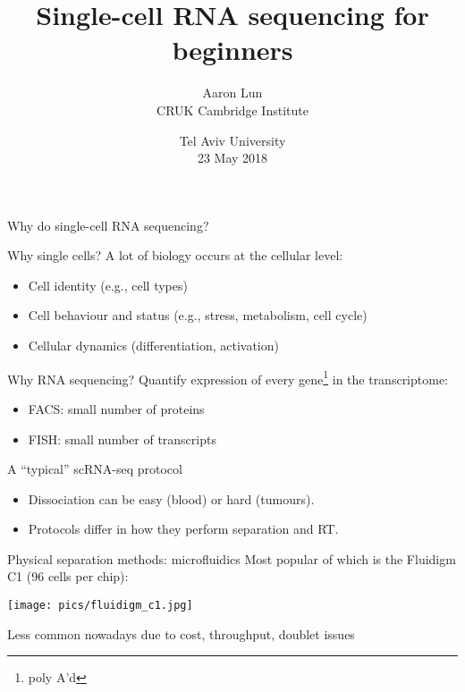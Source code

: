 \documentclass{beamer}
\title{Single-cell RNA sequencing for beginners}
\author{Aaron Lun \\[0.1in]
\footnotesize{CRUK Cambridge Institute}
}
\date{
\footnotesize{Tel Aviv University}\\[0.1in]
23 May 2018
}
\begin{document}
\maketitle

\begin{frame}{Why do single-cell RNA sequencing?}

\begin{exampleblock}{Why single cells?}
A lot of biology occurs at the cellular level:
\begin{itemize}
\item Cell identity (e.g., cell types)
\item Cell behaviour and status (e.g., stress, metabolism, cell cycle)
\item Cellular dynamics (differentiation, activation)
\end{itemize}
\end{exampleblock}

\begin{exampleblock}{Why RNA sequencing?}
Quantify expression of every gene\footnote{poly A'd} in the transcriptome:
\begin{itemize}
\item FACS: small number of proteins
\item FISH: small number of transcripts
\end{itemize}
\end{exampleblock}
\end{frame}

\begin{frame}{A ``typical'' scRNA-seq protocol}
\noindent{}\\[0.1in]

\begin{itemize}
\item Dissociation can be easy (blood) or hard (tumours).
\item Protocols differ in how they perform separation and RT.
\end{itemize}
\end{frame}

\begin{frame}{Physical separation methods: microfluidics}
Most popular of which is the Fluidigm C1 (96 cells per chip):
\begin{center}
\texttt{[image: pics/fluidigm\_c1.jpg]}
\end{center}
Less common nowadays due to cost, throughput, doublet issues
\end{frame}
\end{document}
